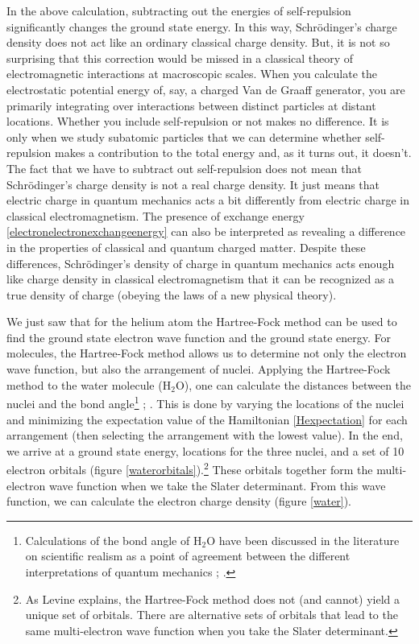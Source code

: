 \documentclass[onecolumn,secnumarabic,amsmath,amssymb,balancelastpage,nofootinbib]{article}
\begin{document}
In the above calculation, subtracting out the energies of self-repulsion significantly changes the ground state energy.  In this way, Schr\"{o}dinger's charge density does not act like an ordinary classical charge density.  But, it is not so surprising that this correction would be missed in a classical theory of electromagnetic interactions at macroscopic scales.  When you calculate the electrostatic potential energy of, say, a charged Van de Graaff generator, you are primarily integrating over interactions between distinct particles at distant locations.  Whether you include self-repulsion or not makes no difference.  It is only when we study subatomic particles that we can determine whether self-repulsion makes a contribution to the total energy and, as it turns out, it doesn't.  The fact that we have to subtract out self-repulsion does not mean that Schr\"{o}dinger's charge density is not a real charge density.  It just means that electric charge in quantum mechanics acts a bit differently from electric charge in classical electromagnetism.  The presence of exchange energy \eqref{electronelectronexchangeenergy} can also be interpreted as revealing a difference in the properties of classical and quantum charged matter.  Despite these differences, Schr\"{o}dinger's density of charge in quantum mechanics acts enough like charge density in classical electromagnetism that it can be recognized as a true density of charge (obeying the laws of a new physical theory).

We just saw that for the helium atom the Hartree-Fock method can be used to find the ground state electron wave function and the ground state energy.  For molecules, the Hartree-Fock method allows us to determine not only the electron wave function, but also the arrangement of nuclei.  Applying the Hartree-Fock method to the water molecule (H$_2$O), one can calculate the distances between the nuclei and the bond angle\footnote{Calculations of the bond angle of H$_2$O have been discussed in the literature on scientific realism as a point of agreement between the different interpretations of quantum mechanics \cite[pg.\ S309]{cordero2001}; \cite[sec.\ 4.5.2]{callender2020}.} \cite[pg.\ 202]{szaboQC}; \cite[sec.\ 15.5]{levineQC}.  This is done by varying the locations of the nuclei and minimizing the expectation value of the Hamiltonian \eqref{Hexpectation} for each arrangement (then selecting the arrangement with the lowest value).  In the end, we arrive at a ground state energy, locations for the three nuclei, and a set of 10 electron orbitals (figure \ref{waterorbitals}).\footnote{As Levine \cite[sec.\ 15.8]{levineQC} explains, the Hartree-Fock method does not (and cannot) yield a unique set of orbitals.  There are alternative sets of orbitals that lead to the same multi-electron wave function when you take the Slater determinant.\label{waterfootnote}}  These orbitals together form the multi-electron wave function when we take the Slater determinant.  From this wave function, we can calculate the electron charge density (figure \ref{water}).
\end{document}
